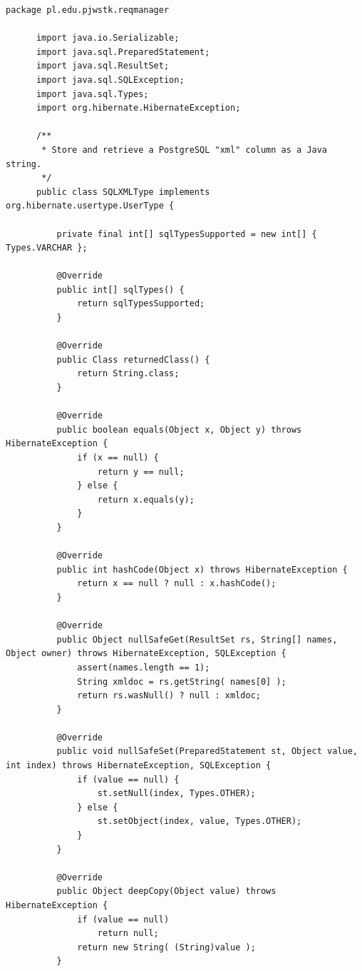       \begin{lstlisting}[caption={Implementacja niestandardowego typu SQLXMLType}, label={lst:xmlType}]
      package pl.edu.pjwstk.reqmanager
       
      import java.io.Serializable;
      import java.sql.PreparedStatement;
      import java.sql.ResultSet;
      import java.sql.SQLException;
      import java.sql.Types;
      import org.hibernate.HibernateException;
       
      /**
       * Store and retrieve a PostgreSQL "xml" column as a Java string.
       */
      public class SQLXMLType implements org.hibernate.usertype.UserType {
       
          private final int[] sqlTypesSupported = new int[] { Types.VARCHAR };
       
          @Override
          public int[] sqlTypes() {
              return sqlTypesSupported;
          }
       
          @Override
          public Class returnedClass() {
              return String.class;
          }
       
          @Override
          public boolean equals(Object x, Object y) throws HibernateException {
              if (x == null) {
                  return y == null;
              } else {
                  return x.equals(y);
              }
          }
       
          @Override
          public int hashCode(Object x) throws HibernateException {
              return x == null ? null : x.hashCode();
          }
       
          @Override
          public Object nullSafeGet(ResultSet rs, String[] names, Object owner) throws HibernateException, SQLException {
              assert(names.length == 1);
              String xmldoc = rs.getString( names[0] );
              return rs.wasNull() ? null : xmldoc;
          }
       
          @Override
          public void nullSafeSet(PreparedStatement st, Object value, int index) throws HibernateException, SQLException {
              if (value == null) {
                  st.setNull(index, Types.OTHER);
              } else {
                  st.setObject(index, value, Types.OTHER);
              }
          }
       
          @Override
          public Object deepCopy(Object value) throws HibernateException {
              if (value == null)
                  return null;
              return new String( (String)value );
          }
       

\end{lstlisting}
